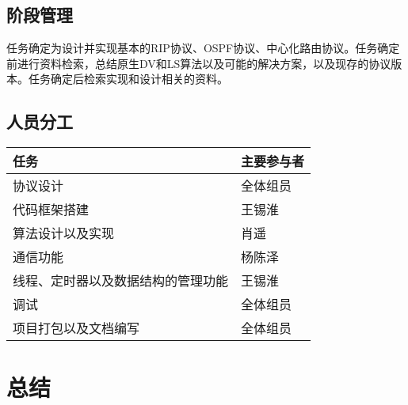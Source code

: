 \documentclass[15pt]{ctexart}
\begin{document}
	\subsection{阶段管理} %
	\label{sub:阶段管理}
		任务确定为设计并实现基本的RIP协议、OSPF协议、中心化路由协议。任务确定前进行资料检索，总结原生DV和LS算法以及可能的解决方案，以及现存的协议版本。任务确定后检索实现和设计相关的资料。
	\subsection{人员分工} %
	\label{sub:人员分工}
		\begin{table}[H]
			\centering
			\begin{tabular}{|l|l|}
				\hline
				任务 & 主要参与者 \\
				\hline
				协议设计 & 全体组员 \\
				\hline
				代码框架搭建 & 王锡淮 \\
				\hline
				算法设计以及实现 & 肖遥 \\
				\hline
				通信功能 & 杨陈泽 \\
				\hline
				线程、定时器以及数据结构的管理功能 & 王锡淮\\
				\hline 
				调试 & 全体组员 \\
				\hline
				项目打包以及文档编写 & 全体组员\\
				\hline
			\end{tabular}
		\end{table}

\section{总结} %
\label{sec:总结}
\end{document}
